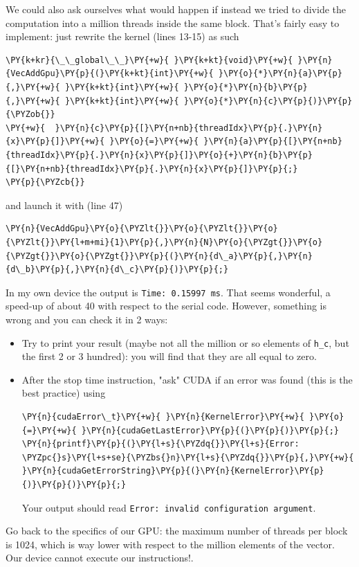 We could also ask ourselves what would happen if instead we tried to divide the computation into a million threads inside the same block. That's fairly easy to implement: just rewrite the kernel (lines 13-15) as such
\begin{Verbatim}[commandchars=\\\{\}]
\PY{k+kr}{\_\_global\_\_}\PY{+w}{ }\PY{k+kt}{void}\PY{+w}{ }\PY{n}{VecAddGpu}\PY{p}{(}\PY{k+kt}{int}\PY{+w}{ }\PY{o}{*}\PY{n}{a}\PY{p}{,}\PY{+w}{ }\PY{k+kt}{int}\PY{+w}{ }\PY{o}{*}\PY{n}{b}\PY{p}{,}\PY{+w}{ }\PY{k+kt}{int}\PY{+w}{ }\PY{o}{*}\PY{n}{c}\PY{p}{)}\PY{p}{\PYZob{}}
\PY{+w}{  }\PY{n}{c}\PY{p}{[}\PY{n+nb}{threadIdx}\PY{p}{.}\PY{n}{x}\PY{p}{]}\PY{+w}{ }\PY{o}{=}\PY{+w}{ }\PY{n}{a}\PY{p}{[}\PY{n+nb}{threadIdx}\PY{p}{.}\PY{n}{x}\PY{p}{]}\PY{o}{+}\PY{n}{b}\PY{p}{[}\PY{n+nb}{threadIdx}\PY{p}{.}\PY{n}{x}\PY{p}{]}\PY{p}{;}
\PY{p}{\PYZcb{}}
\end{Verbatim}
and launch it with (line 47)
\begin{Verbatim}[commandchars=\\\{\}]
\PY{n}{VecAddGpu}\PY{o}{\PYZlt{}}\PY{o}{\PYZlt{}}\PY{o}{\PYZlt{}}\PY{l+m+mi}{1}\PY{p}{,}\PY{n}{N}\PY{o}{\PYZgt{}}\PY{o}{\PYZgt{}}\PY{o}{\PYZgt{}}\PY{p}{(}\PY{n}{d\_a}\PY{p}{,}\PY{n}{d\_b}\PY{p}{,}\PY{n}{d\_c}\PY{p}{)}\PY{p}{;}
\end{Verbatim}
In my own device the output is \texttt{Time: 0.15997 ms}. That seems wonderful, a speed-up of about 40 with respect to the serial code. However, something is wrong and you can check it in 2 ways:
\begin{itemize}
\item[-] Try to print your result (maybe not all the million or so elements of \texttt{h\_c}, but the first 2 or 3 hundred): you will find that they are all equal to zero. 
\item[-] After the stop time instruction, "ask" CUDA if an error was found (this is the best practice) using 
\begin{Verbatim}[commandchars=\\\{\}]
\PY{n}{cudaError\_t}\PY{+w}{ }\PY{n}{KernelError}\PY{+w}{ }\PY{o}{=}\PY{+w}{ }\PY{n}{cudaGetLastError}\PY{p}{(}\PY{p}{)}\PY{p}{;}
\PY{n}{printf}\PY{p}{(}\PY{l+s}{\PYZdq{}}\PY{l+s}{Error: \PYZpc{}s}\PY{l+s+se}{\PYZbs{}n}\PY{l+s}{\PYZdq{}}\PY{p}{,}\PY{+w}{ }\PY{n}{cudaGetErrorString}\PY{p}{(}\PY{n}{KernelError}\PY{p}{)}\PY{p}{)}\PY{p}{;}
\end{Verbatim}
Your output should read \texttt{Error: invalid configuration argument}.
\end{itemize}
Go back to the specifics of our GPU: the maximum number of threads per block is 1024, which is way lower with respect to the million elements of the vector. Our device cannot execute our instructions!.

